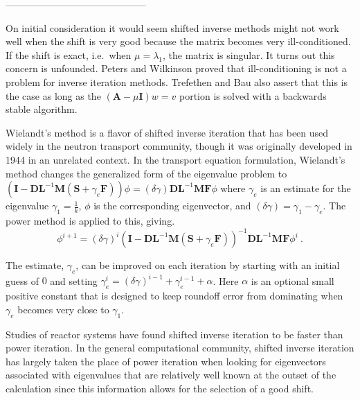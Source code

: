 \documentclass[12pt]{article}
\newcommand{\ve}[1]{\ensuremath{\mathbf{#1}}}
\begin{document}
--------------------------------------------

On initial consideration it would seem shifted inverse methods might not work well when the shift is very good because the matrix becomes very ill-conditioned. If the shift is exact, i.e.\ when $\mu = \lambda_{1}$, the matrix is singular. It turns out this concern is unfounded. Peters and Wilkinson proved that ill-conditioning is not a problem for inverse iteration methods. %
Trefethen and Bau also assert that this is the case as long as the $(\ve{A}-\mu \ve{I})w = v$ portion is solved with a backwards stable algorithm.%

Wielandt's method is a flavor of shifted inverse iteration that has been used widely in the neutron transport community, though it was originally developed in 1944 in an unrelated context. %
In the transport equation formulation, Wielandt's method changes the generalized form of the eigenvalue problem to $(\ve{I} - \ve{DL}^{-1}\ve{M}(\ve{S} +\gamma_e \ve{F}))\phi = (\delta \gamma) \ve{DL}^{-1}\ve{MF} \phi$ where $\gamma_e$ is an estimate for the eigenvalue $\gamma_1 = \frac{1}{k}$, $\phi$ is the corresponding eigenvector, and $(\delta \gamma) = \gamma_1 - \gamma_e$. The power method is applied to this, giving.%
%
\begin{equation}
\phi^{i+1} = (\delta \gamma)^{i}(\ve{I} - \ve{DL}^{-1}\ve{M}(\ve{S} + \gamma_e \ve{F}))^{-1}\ve{DL}^{-1}\ve{MF}\phi^{i} \:. \label{eq:Wielandt}
\end{equation}

The estimate, $\gamma_e$, can be improved on each iteration by starting with an initial guess of $0$ and setting $\gamma_e^i = (\delta \gamma)^{i-1} + \gamma_e^{i-1} + \alpha$. Here $\alpha$ is an optional small positive constant that is designed to keep roundoff error from dominating when $\gamma_e$ becomes very close to $\gamma_1$.%

Studies of reactor systems have found shifted inverse iteration to be faster than power iteration. %
In the general computational community, shifted inverse iteration has largely taken the place of power iteration when looking for eigenvectors associated with eigenvalues that are relatively well known at the outset of the calculation since this information allows for the selection of a good shift.%


\end{document}
